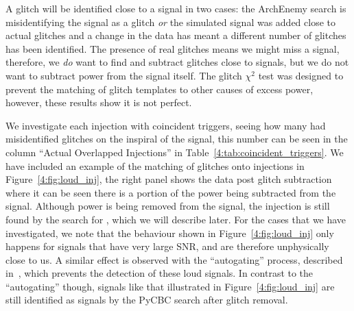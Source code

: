 A \scladj glitch will be identified close to a \gwadj signal in two cases: the ArchEnemy search is misidentifying the \gwadj signal as a glitch \emph{or} the simulated signal was added close to actual glitches and a change in the data has meant a different number of glitches has been identified. The presence of real \scladj glitches means we might miss a \gwadj signal, therefore, we \emph{do} want to find and subtract glitches close to \gwadj signals, but we do not want to subtract power from the \gwadj signal itself. The \scladj glitch $\chi^{2}$ test was designed to prevent the matching of \scladj glitch templates to other causes of excess power, however, these results show it is not perfect.

We investigate each injection with coincident \scladj triggers, seeing how many had misidentified \scladj glitches on the inspiral of the \gwadj signal, this number can be seen in the column ``Actual Overlapped Injections'' in Table~\ref{4:tab:coincident_triggers}. We have included an example of the matching of \scladj glitches onto \gwadj injections in Figure~\ref{4:fig:loud_inj}, the right panel shows the \gwadj data post glitch subtraction where it can be seen there is a portion of the power being subtracted from the signal. Although power is being removed from the signal, the \gwadj injection is still found by the search for \gws, which we will describe later. For the cases that we have investigated, we note that the behaviour shown in Figure~\ref{4:fig:loud_inj} only happens for signals that have very large SNR, and are therefore unphysically close to us. A similar effect is observed with the ``autogating'' process, described in~\cite{PyCBC:2016}, which prevents the detection of these loud signals. In contrast to the ``autogating'' though, signals like that illustrated in Figure~\ref{4:fig:loud_inj} are still identified as \gwadj signals by the PyCBC search after \scladj glitch removal.

